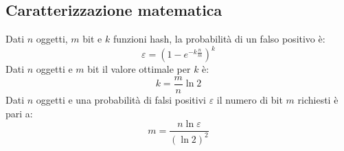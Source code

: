 \subsection{Caratterizzazione matematica}
Dati $n$ oggetti, $m$ bit e $k$ funzioni hash, la probabilit\`a di un falso positivo \`e:
\begin{equation*}
\varepsilon=(1-e^{-k\frac{n}{m}})^k
\end{equation*}
Dati $n$ oggetti e $m$ bit il valore ottimale per $k$ \`e:
\begin{equation*}
k=\dfrac{m}{n}\ln 2
\end{equation*}
Dati $n$ oggetti e una probabilit\`a di falsi positivi $\varepsilon$ il numero di bit $m$ richiesti \`e pari a:
\begin{equation*}
m=\dfrac{n\ln\varepsilon}{(\ln 2)^2}
\end{equation*}
